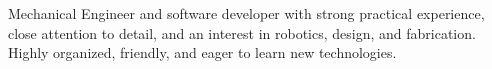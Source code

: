\begin{minipage}[t]{0.5\sectionHeaderIndent}
    \hspace{0em}
\end{minipage}%
\begin{minipage}[t]{\textwidth - \sectionHeaderIndent}
    Mechanical Engineer and software developer with strong practical experience, close attention to detail, and an interest in robotics, design, and fabrication. Highly organized, friendly, and eager to learn new technologies.
\end{minipage}
\break

